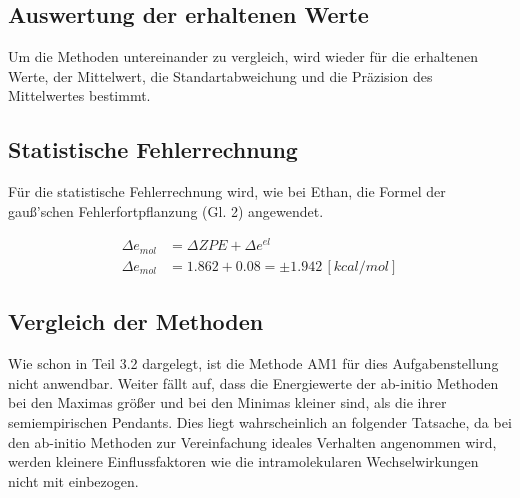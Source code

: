 \subsection{Auswertung der erhaltenen Werte}
Um die Methoden untereinander zu vergleich, wird wieder für die erhaltenen Werte, der Mittelwert, die Standartabweichung und die Präzision des Mittelwertes bestimmt.

 

\subsection{Statistische Fehlerrechnung}

Für die statistische Fehlerrechnung wird, wie bei Ethan, die Formel der gauß'schen Fehlerfortpflanzung (Gl. 2) angewendet.

\begin{align*}
    \Delta e_{mol} &= \Delta ZPE + \Delta e^{el} \\
    \Delta e_{mol} &= 1.862 + 0.08 = \pm 1.942 \, [kcal/mol]
\end{align*}

\subsection{Vergleich der Methoden}

Wie schon in Teil 3.2 dargelegt, ist die Methode AM1 für dies Aufgabenstellung nicht anwendbar. Weiter fällt auf, dass die Energiewerte der ab-initio Methoden
bei den Maximas  größer und bei den Minimas kleiner sind, als die ihrer semiempirischen Pendants. Dies liegt wahrscheinlich an folgender Tatsache, da bei den ab-initio
Methoden zur Vereinfachung ideales Verhalten angenommen wird, werden kleinere Einflussfaktoren wie die intramolekularen Wechselwirkungen nicht mit einbezogen.
